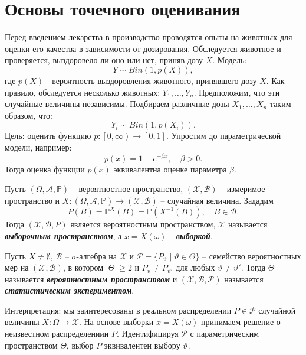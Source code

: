 \graphicspath{{./chapters/chapter02/}}
\chapter{Основы точечного оценивания}

\begin{exmp}
	Перед введением лекарства в производство проводятся опыты на животных для оценки его качества в зависимости от дозирования. Обследуется животное и проверяется, выздоровело ли оно или нет, приняв дозу $X$. Модель:
	\[Y \sim Bin(1, p(X)),\]
	где $p(X)$ - вероятность выздоровления животного, принявшего дозу $X$.
	Как правило, обследуется несколько животных: $Y_1, \dots, Y_n$. Предположим, что эти случайные величины независимы. Подбираем различные дозы $X_1, \dots, X_n$ таким образом, что:
	\[Y_i \sim Bin(1,p(X_i)). \]
	Цель: оценить функцию $p: \left[0, \infty \right) \rightarrow [0, 1]$. Упростим до параметрической модели, например: \[p(x)=1-e^{-\beta x}, \quad \beta>0 .\]
	Тогда оценка функции $p(x)$ эквивалентна оценке параметра $\beta$.
\end{exmp}

\begin{asmp}
	Пусть $(\Omega, \mathcal{A}, \mathbb{P})$ -- вероятностное пространство, $(\mathcal{X}, \mathcal{B})$ -- измеримое пространство и $X:(\Omega, \mathcal{A}, \mathbb{P}) \rightarrow (\mathcal{X}, \mathcal{B})$ -- случайная величина. Зададим
	\[P(B)=\mathbb{P}^X(B)=\mathbb{P}(X^{-1}(B)), \quad B \in \mathcal{B}.  \]
	Тогда $(\mathcal{X}, \mathcal{B}, P)$ является вероятностным пространством, $\mathcal{X}$ называется \textbf{\textit{выборочным пространством}}, а $x=X(\omega)$ -- \textbf{\textit{выборкой}}. 
\end{asmp}

\begin{defn}
	Пусть $X \neq \emptyset$, $\mathcal{B}$ -- $\sigma$-алгебра на $\mathcal{X}$ и $\mathcal{P}=\{P_\vartheta \mid \vartheta \in \Theta \}$ -- семейство вероятностных мер на $(\mathcal{X}, \mathcal{B})$, в котором $|\Theta| \geq 2$ и $P_\vartheta \neq P_{\vartheta'}$ для любых $\vartheta \neq \vartheta'$. Тогда $\Theta$ называется \textbf{\textit{вероятностным пространством}} и $(\mathcal{X}, \mathcal{B}, \mathcal{P})$ называется \textbf{\textit{статистическим экспериментом}}.
\end{defn}

\begin{rmrk}
	Интерпретация: мы заинтересованы в реальном распределении $P \in \mathcal{P}$ случайной величины $X:\Omega \rightarrow \mathcal{X}.$ На основе выборки $x=X(\omega)$ принимаем решение о неизвестном распределениии $P$. Идентифицируя $\mathcal{P}$ с параметрическим пространством $\Theta$, выбор $P$ эквивалентен выбору $\vartheta$.
	
\end{rmrk}

